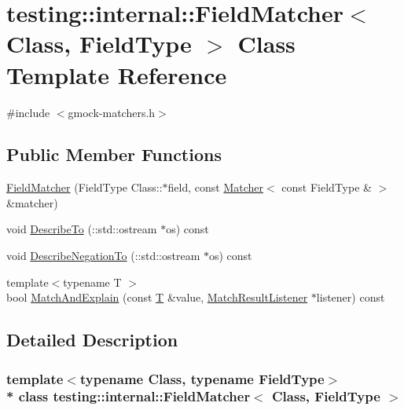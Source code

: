 \hypertarget{classtesting_1_1internal_1_1_field_matcher}{}\section{testing\+:\+:internal\+:\+:Field\+Matcher$<$ Class, Field\+Type $>$ Class Template Reference}
\label{classtesting_1_1internal_1_1_field_matcher}


{\ttfamily \#include $<$gmock-\/matchers.\+h$>$}

\subsection*{Public Member Functions}
\begin{DoxyCompactItemize}
\item 
\hyperlink{classtesting_1_1internal_1_1_field_matcher_adf3435dcc9592b75e474cc90b1424952}{Field\+Matcher} (Field\+Type Class\+::$\ast$field, const \hyperlink{classtesting_1_1_matcher}{Matcher}$<$ const Field\+Type \& $>$ \&matcher)
\item 
void \hyperlink{classtesting_1_1internal_1_1_field_matcher_ac3b02441e2254652579c6e98a25c9b5b}{Describe\+To} (\+::std\+::ostream $\ast$os) const 
\item 
void \hyperlink{classtesting_1_1internal_1_1_field_matcher_aae4069f3686609c9612798e73f28ca05}{Describe\+Negation\+To} (\+::std\+::ostream $\ast$os) const 
\item 
{\footnotesize template$<$typename T $>$ }\\bool \hyperlink{classtesting_1_1internal_1_1_field_matcher_a68fd542e3933c11da824e5e93d3f9858}{Match\+And\+Explain} (const \hyperlink{functions__7_8js_adf1f3edb9115acb0a1e04209b7a9937b}{T} \&value, \hyperlink{classtesting_1_1_match_result_listener}{Match\+Result\+Listener} $\ast$listener) const 
\end{DoxyCompactItemize}


\subsection{Detailed Description}
\subsubsection*{template$<$typename Class, typename Field\+Type$>$\\*
class testing\+::internal\+::\+Field\+Matcher$<$ Class, Field\+Type $>$}



